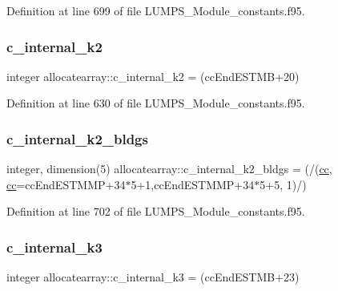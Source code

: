 Definition at line 699 of file L\+U\+M\+P\+S\+\_\+\+Module\+\_\+constants.\+f95.

\mbox{\label{namespaceallocatearray_ac07e6d3eb8a34554cf3e72d8aaf64393}} 
\subsubsection{\texorpdfstring{c\+\_\+internal\+\_\+k2}{c\_internal\_k2}}
{\footnotesize\ttfamily integer allocatearray\+::c\+\_\+internal\+\_\+k2 = (cc\+End\+E\+S\+T\+MB+20)}



Definition at line 630 of file L\+U\+M\+P\+S\+\_\+\+Module\+\_\+constants.\+f95.

\mbox{\label{namespaceallocatearray_ab244f908ab9c1ad7b312e932bb423acc}} 
\subsubsection{\texorpdfstring{c\+\_\+internal\+\_\+k2\+\_\+bldgs}{c\_internal\_k2\_bldgs}}
{\footnotesize\ttfamily integer, dimension(5) allocatearray\+::c\+\_\+internal\+\_\+k2\+\_\+bldgs = (/(\hyperlink{namespaceallocatearray_ac863c81704eb507dee10f5e10741e10c}{cc}, \hyperlink{namespaceallocatearray_ac863c81704eb507dee10f5e10741e10c}{cc}=cc\+End\+E\+S\+T\+M\+MP+34$\ast$5+1,cc\+End\+E\+S\+T\+M\+MP+34$\ast$5+5, 1)/)}



Definition at line 702 of file L\+U\+M\+P\+S\+\_\+\+Module\+\_\+constants.\+f95.

\mbox{\label{namespaceallocatearray_a452b162600f15987ceaa36c9a01186b0}} 
\subsubsection{\texorpdfstring{c\+\_\+internal\+\_\+k3}{c\_internal\_k3}}
{\footnotesize\ttfamily integer allocatearray\+::c\+\_\+internal\+\_\+k3 = (cc\+End\+E\+S\+T\+MB+23)}



